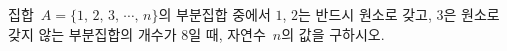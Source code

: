 집합~$A=\{1,\,2,\,3,\,\cdots,\,n\}$의 부분집합 중에서 $1$, $2$는 반드시 원소로 갖고, $3$은 원소로 갖지 않는 부분집합의 개수가 $8$일 때, 자연수~$n$의 값을 구하시오.
